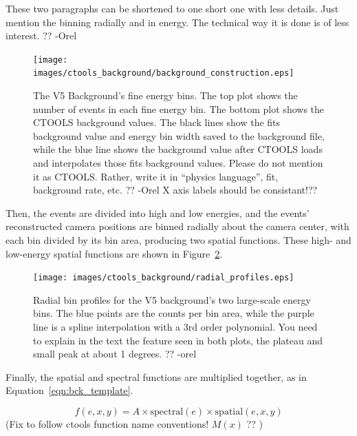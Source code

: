     {\color{red}These two paragraphs can be shortened to one short one with less details. Just mention the binning radially and in energy. The technical way it is done is of less interest. ?? -Orel}

    \begin{figure}[ht]
      \centering
      \texttt{[image: images/ctools\_background/background\_construction.eps]}
      \caption[CTOOLS Background Fine Energy Bins]{
        The V5 Background's fine energy bins.
        The top plot shows the number of events in each fine energy bin.
        The bottom plot shows the CTOOLS background values.
        The black lines show the fits background value and energy bin width saved to the background file, while the blue line shows the background value after CTOOLS loads and interpolates those fits background values.
        {\color{red}Please do not mention it as CTOOLS. Rather, write it in “physics language”, fit, background rate, etc. ?? -Orel}
        {\color{red}X axis labels should be consistant!??}
      }
      \label{fig:background_profile}
    \end{figure}

    Then, the events are divided into high and low energies, and the events' reconstructed camera positions are binned radially about the camera center, with each bin divided by its bin area, producing two spatial functions.
    These high- and low-energy spatial functions are shown in Figure~\ref{fig:background_radial}.
    
    \begin{figure}[ht]
      \centering
      \texttt{[image: images/ctools\_background/radial\_profiles.eps]}
      \caption[CTOOLS Radial Background Profiles]{
        Radial bin profiles for the V5 background's two large-scale energy bins.
        The blue points are the counts per bin area, while the purple line is a spline interpolation with a 3rd order polynomial.
        {\color{red}You need to explain in the text the feature seen in both plots, the plateau and small peak at about 1 degrees. ?? -orel}
        }
      \label{fig:background_radial}
    \end{figure}
    
    Finally, the spatial and spectral functions are multiplied together, as in Equation~\ref{eqn:bck_template}.
    
    \begin{equation}\label{eqn:bck_template}
      f(e,x,y) = A \times \textrm{spectral}(e) \times \textrm{spatial}(e,x,y) 
    \end{equation} 
    {\color{red}(Fix to follow ctools function name conventions! $M(x)$ ?? )}
    
